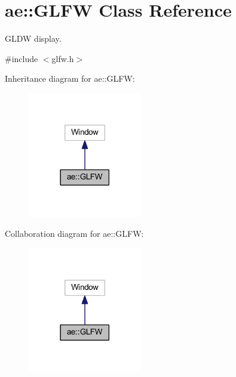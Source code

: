 \hypertarget{classae_1_1_g_l_f_w}{}\section{ae\+:\+:G\+L\+FW Class Reference}
\label{classae_1_1_g_l_f_w}


G\+L\+DW display.  




{\ttfamily \#include $<$glfw.\+h$>$}



Inheritance diagram for ae\+:\+:G\+L\+FW\+:
\nopagebreak
\begin{figure}[H]
\begin{center}
\leavevmode
\includegraphics[width=141pt]{classae_1_1_g_l_f_w__inherit__graph}
\end{center}
\end{figure}


Collaboration diagram for ae\+:\+:G\+L\+FW\+:
\nopagebreak
\begin{figure}[H]
\begin{center}
\leavevmode
\includegraphics[width=141pt]{classae_1_1_g_l_f_w__coll__graph}
\end{center}
\end{figure}
